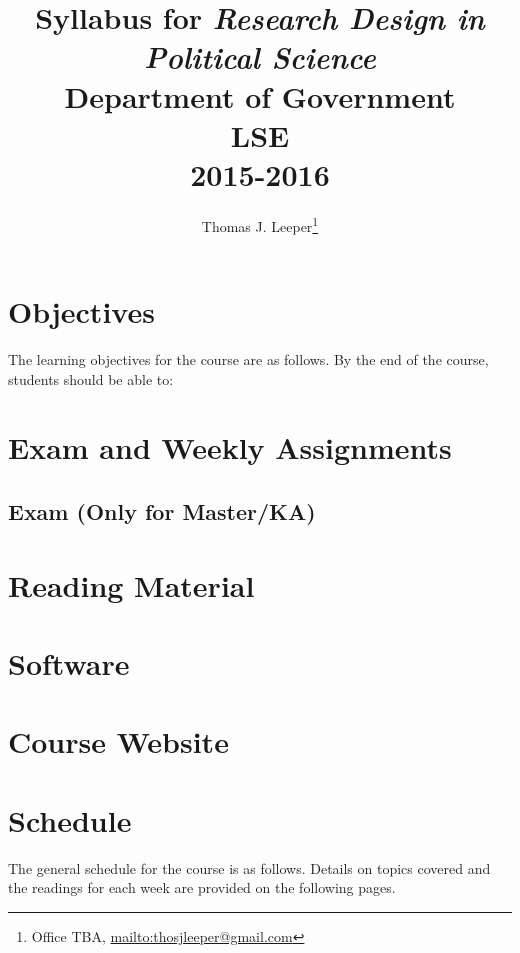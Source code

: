 \documentclass[11pt,a4paper]{article}
\title{Syllabus for \textit{Research Design in Political Science}\\Department of Government\\LSE\\2015-2016}
\author{Thomas J. Leeper\thanks{Office TBA, \url{mailto:thosjleeper@gmail.com}}}
\begin{document}
\nobibliography*

\maketitle

\faketableofcontents




\clearpage
\section{Objectives}
The learning objectives for the course are as follows. By the end of the course, students should be able to:

\begin{enumerate*}
\item 
\end{enumerate*}

\section{Exam and Weekly Assignments}

\subsection{Exam (Only for Master/KA)}


\clearpage
\section{Reading Material}

\section{Software}

\section{Course Website}




\clearpage
\section{Schedule}
The general schedule for the course is as follows. Details on topics covered and the readings for each week are provided on the following pages.
\end{document}
